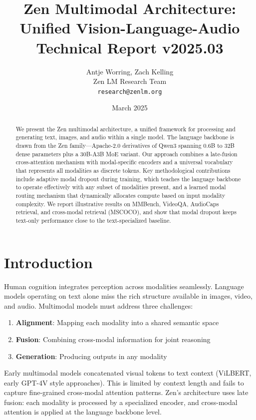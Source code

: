 \documentclass[11pt,a4paper]{article}
\title{\textbf{Zen Multimodal Architecture: Unified Vision-Language-Audio}\\
\large Technical Report v2025.03}
\author{Antje Worring, Zach Kelling \\ Zen LM Research Team\\
\texttt{research@zenlm.org}}
\date{March 2025}
\begin{document}
\maketitle

\begin{abstract}
We present the Zen multimodal architecture, a unified framework for processing and
generating text, images, and audio within a single model. The language backbone is drawn
from the Zen family---Apache-2.0 derivatives of Qwen3 spanning 0.6B to 32B dense
parameters plus a 30B-A3B MoE variant. Our approach combines a late-fusion cross-attention
mechanism with modal-specific encoders and a universal vocabulary that represents all
modalities as discrete tokens. Key methodological contributions include adaptive modal
dropout during training, which teaches the language backbone to operate effectively with
any subset of modalities present, and a learned modal routing mechanism that dynamically
allocates compute based on input modality complexity. We report illustrative results on
MMBench, VideoQA, AudioCaps retrieval, and cross-modal retrieval (MSCOCO), and show that
modal dropout keeps text-only performance close to the text-specialized baseline.
\end{abstract}

\section{Introduction}

Human cognition integrates perception across modalities seamlessly. Language models
operating on text alone miss the rich structure available in images, video, and audio.
Multimodal models must address three challenges:

\begin{enumerate}
  \item \textbf{Alignment}: Mapping each modality into a shared semantic space
  \item \textbf{Fusion}: Combining cross-modal information for joint reasoning
  \item \textbf{Generation}: Producing outputs in any modality
\end{enumerate}

Early multimodal models concatenated visual tokens to text context (ViLBERT, early
GPT-4V style approaches). This is limited by context length and fails to capture
fine-grained cross-modal attention patterns. Zen's architecture uses late fusion:
each modality is processed by a specialized encoder, and cross-modal attention is
applied at the language backbone level.
\end{document}
